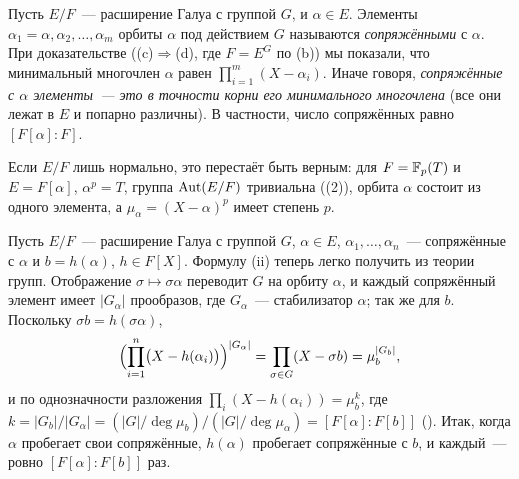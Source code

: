 \begin{remark}[3.14]
Пусть $E/F$~--- расширение Галуа с группой $G$, и $\alpha\in E$. Элементы $\alpha_1=\alpha,\alpha_2,\dots,\alpha_m$ орбиты $\alpha$ под
действием $G$ называются \emph{сопряжёнными} с $\alpha$. При доказательстве  ((c)$\Rightarrow$(d), где $F=E^G$ по
(b)) мы показали, что минимальный многочлен $\alpha$ равен $\prod_{i=1}^m(X-\alpha_i)$. Иначе говоря,
\emph{сопряжённые с $\alpha$ элементы~--- это в точности корни его минимального многочлена} (все они лежат в $E$ и
попарно различны). В частности, число сопряжённых равно $[F[\alpha]:F]$.
\end{remark}

Если $E/F$ лишь нормально, это перестаёт быть верным: для $F=\mathbb F_p(T)$ и $E=F[\alpha]$, $\alpha^p=T$, группа $\operatorname{Aut}(E/F)$
тривиальна ((2)), орбита $\alpha$ состоит из одного элемента, а $\mu_\alpha=(X-\alpha)^p$ имеет степень $p$.

\begin{remark}[3.14a]
Пусть $E/F$~--- расширение Галуа с группой $G$, $\alpha\in E$, $\alpha_1,\dots,\alpha_n$~--- сопряжённые с $\alpha$ и $b=h(\alpha)$,
$h\in F[X]$. Формулу (ii) теперь легко получить из теории групп. Отображение $\sigma\mapsto\sigma\alpha$ переводит $G$ на
орбиту $\alpha$, и каждый сопряжённый элемент имеет $|G_\alpha|$ прообразов, где $G_\alpha$~--- стабилизатор $\alpha$; так же для
$b$. Поскольку $\sigma b=h(\sigma\alpha)$,
\[
\Bigl(\prod_{i=1}^n\bigl(X-h(\alpha_i)\bigr)\Bigr)^{|G_\alpha|}=\prod_{\sigma\in G}(X-\sigma b)=\mu_b^{|G_b|},
\]
и по однозначности разложения $\prod_i(X-h(\alpha_i))=\mu_b^{k}$, где
$k=|G_b|/|G_\alpha|=(|G|/\deg\mu_b)/(|G|/\deg\mu_\alpha)=[F[\alpha]:F[b]]$ (). Итак, когда $\alpha$ пробегает свои
сопряжённые, $h(\alpha)$ пробегает сопряжённые с $b$, и каждый~--- ровно $[F[\alpha]:F[b]]$ раз.
\end{remark}

